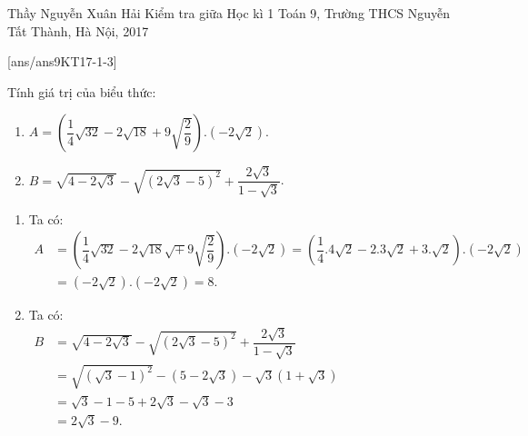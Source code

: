 \begin{name}
{Thầy  Nguyễn Xuân Hải}
{Kiểm tra giữa Học kì 1 Toán 9, Trường THCS Nguyễn Tất Thành, Hà Nội, 2017}
\end{name}
\setcounter{ex}{0}
[ans/ans9KT17-1-3]
\begin{ex} %
	Tính giá trị của biểu thức:
    \begin{enumerate}
        \item $A=\left(\dfrac{1}{4}\sqrt{32}-2\sqrt{18}+9\sqrt{\dfrac{2}{9}} \right).\left( -2\sqrt{2}\right) $.
        \item  $B=\sqrt{4-2\sqrt{3}}-\sqrt{(2\sqrt{3}-5)^2}+\dfrac{2\sqrt{3}}{1-\sqrt{3}}$.
    \end{enumerate}
\loigiai
    {
    \begin{enumerate}
        \item Ta có:\\
        $\begin{aligned}
         A&=\left(\dfrac{1}{4}\sqrt{32}-2\sqrt{18}\sqrt+9\sqrt{\dfrac{2}{9}} \right).\left( -2\sqrt{2}\right) = \left(\dfrac{1}{4}.4\sqrt{2}-2.3\sqrt{2}+3.\sqrt{2}\right).\left( -2\sqrt{2}\right)\\
         &=\left(-2\sqrt{2}\right).\left( -2\sqrt{2}\right)=8.
        \end{aligned}$
        \item Ta có:\\
        $\begin{aligned}
        B&=\sqrt{4-2\sqrt{3}}-\sqrt{(2\sqrt{3}-5)^2}+\dfrac{2\sqrt{3}}{1-\sqrt{3}}\\
        &=\sqrt{(\sqrt{3}-1)^2}-(5-2\sqrt{3})-\sqrt{3}(1+\sqrt{3})\\
        &=\sqrt{3}-1-5+2\sqrt{3}-\sqrt{3}-3\\
        &=2\sqrt{3}-9.
        \end{aligned}$
    \end{enumerate}
    }
\end{ex}

